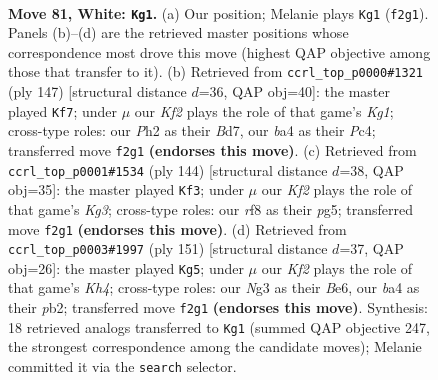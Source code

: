 \documentclass[11pt]{article}
\begin{document}
\clearpage

\begin{figure}[p]\centering
\begin{subfigure}{0.46\textwidth}\centering
\resizebox{\linewidth}{!}{%
\newchessgame
\chessboard[
  setfen={5r2/5p2/n5p1/3BP2p/b4Pp1/6N1/3k1K1P/8 w - - 20 81},
  showmover=false,
  pgfstyle=straightmove, color=movearrow, markmove={f2-g1}
]}
\caption{}
\end{subfigure}\hfill
\begin{subfigure}{0.46\textwidth}\centering
\resizebox{\linewidth}{!}{%
\newchessgame
\chessboard[
  setfen={6k1/3bB2p/4n2P/4P1p1/2pP4/2P5/6B1/K7 b - - 0 74},
  showmover=false,
  pgfstyle=straightmove, color=movearrow, markmove={g8-f7}
]}
\caption{}
\end{subfigure}
\\[4pt]
\begin{subfigure}{0.46\textwidth}\centering
\resizebox{\linewidth}{!}{%
\newchessgame
\chessboard[
  setfen={8/1p3pk1/p7/P1N3pP/1P1p4/6K1/8/8 w - - 2 73},
  showmover=false,
  pgfstyle=straightmove, color=movearrow, markmove={g3-f3}
]}
\caption{}
\end{subfigure}\hfill
\begin{subfigure}{0.46\textwidth}\centering
\resizebox{\linewidth}{!}{%
\newchessgame
\chessboard[
  setfen={8/2B5/4b3/1p5k/1P3p1p/5P1P/1P4P1/6K1 b - - 23 76},
  showmover=false,
  pgfstyle=straightmove, color=movearrow, markmove={h5-g5}
]}
\caption{}
\end{subfigure}
\caption{\textbf{Move 81, White: \texttt{Kg1}.} (a) Our position; Melanie plays \texttt{Kg1} (\texttt{f2g1}). Panels (b)--(d) are the retrieved master positions whose correspondence most drove this move (highest QAP objective among those that transfer to it). (b) Retrieved from \texttt{ccrl\_top\_p0000\#1321} (ply 147) [structural distance $d$=36, QAP obj=40]: the master played \texttt{Kf7}; under $\mu$ our \emph{Kf2} plays the role of that game's \emph{Kg1}; cross-type roles: our \emph{P}h2 as their \emph{B}d7, our \emph{b}a4 as their \emph{P}c4; transferred move \texttt{f2g1} \textbf{(endorses this move)}. (c) Retrieved from \texttt{ccrl\_top\_p0001\#1534} (ply 144) [structural distance $d$=38, QAP obj=35]: the master played \texttt{Kf3}; under $\mu$ our \emph{Kf2} plays the role of that game's \emph{Kg3}; cross-type roles: our \emph{r}f8 as their \emph{p}g5; transferred move \texttt{f2g1} \textbf{(endorses this move)}. (d) Retrieved from \texttt{ccrl\_top\_p0003\#1997} (ply 151) [structural distance $d$=37, QAP obj=26]: the master played \texttt{Kg5}; under $\mu$ our \emph{Kf2} plays the role of that game's \emph{Kh4}; cross-type roles: our \emph{N}g3 as their \emph{B}e6, our \emph{b}a4 as their \emph{p}b2; transferred move \texttt{f2g1} \textbf{(endorses this move)}. Synthesis: 18 retrieved analogs transferred to \texttt{Kg1} (summed QAP objective 247, the strongest correspondence among the candidate moves); Melanie committed it via the \texttt{search} selector.}
\label{fig:thought-m160}
\end{figure}
\end{document}
